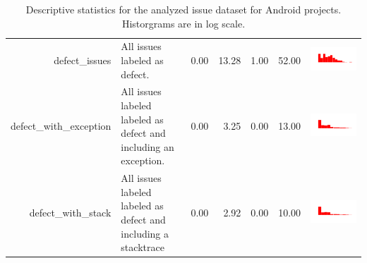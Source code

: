 \begin{table}[ht]
\begin{tabular}{rp{16em}rrrrc}
  defect\_issues & All issues labeled as defect. & 0.00 & 13.28 & 1.00 & 52.00 & \includegraphics[scale = 0.1, clip = true, trim= 50px 60px 50px 60px]{hist-eb1797e86ef23b2a07907e5ccbeff7b9.pdf} \\ 
  defect\_with\_exception & All issues labeled labeled as defect and including an exception. & 0.00 & 3.25 & 0.00 & 13.00 & \includegraphics[scale = 0.1, clip = true, trim= 50px 60px 50px 60px]{hist-f1a879616aa3e0995db35c6c02bc8520.pdf} \\ 
  defect\_with\_stack & All issues labeled labeled as defect and including a stacktrace & 0.00 & 2.92 & 0.00 & 10.00 & \includegraphics[scale = 0.1, clip = true, trim= 50px 60px 50px 60px]{hist-49dbfa02c366cab8b489f33014de587d.pdf} \\ 
   \hline
\end{tabular}
\caption{Descriptive statistics for the analyzed issue dataset for Android projects. Historgrams are in log scale.} 
\label{tab:android-stack-stats}
\end{table}
